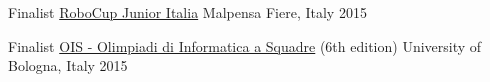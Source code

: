 
\begin{cvhonors}

  \cvhonor
    {Finalist}
    {\href{http://www.robocupjunior.it/}{RoboCup Junior Italia}}
    {Malpensa Fiere, Italy}
    {2015}

  \cvhonor
    {Finalist}
    {\href{https://sites.google.com/aldini.istruzioneer.it/olimpiadi-informatica-squadre/campionati/201415-6-edizione}{OIS - Olimpiadi di Informatica a Squadre} (6th edition)}
    {University of Bologna, Italy}
    {2015}

\end{cvhonors}
